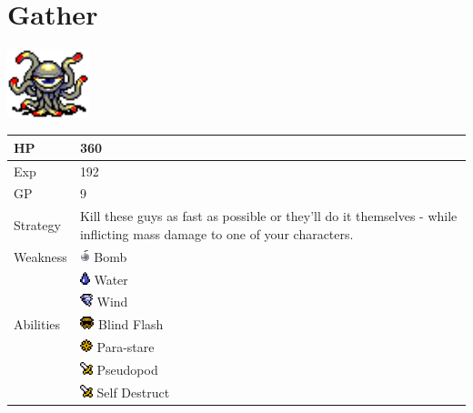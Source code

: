 \section{Gather}
\label{monster:gather}

\includegraphics[height=2cm,keepaspectratio]{./resources/monster/gather}

\begin{longtable}{ l p{9cm} }
	HP
	& 360
\\ \hline
	Exp
	& 192
\\ \hline
	GP
	& 9
\\ \hline
	Strategy
	& Kill these guys as fast as possible or they'll do it themselves - while inflicting mass damage to one of your characters.
\\ \hline
	Weakness
	& \includegraphics[height=1em,keepaspectratio]{./resources/effects/bomb} Bomb \\
	& \includegraphics[height=1em,keepaspectratio]{./resources/effects/water} Water \\
	& \includegraphics[height=1em,keepaspectratio]{./resources/effects/Wind} Wind
\\ \hline
	Abilities
	& \includegraphics[height=1em,keepaspectratio]{./resources/effects/blind} Blind Flash \\
	& \includegraphics[height=1em,keepaspectratio]{./resources/effects/paralyze} Para-stare \\
	& \includegraphics[height=1em,keepaspectratio]{./resources/effects/damage} Pseudopod \\
	& \includegraphics[height=1em,keepaspectratio]{./resources/effects/damage} Self Destruct
\end{longtable}
